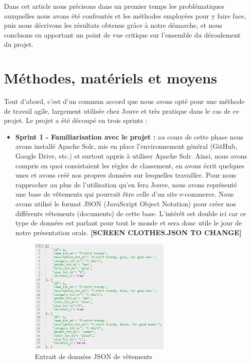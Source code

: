 \documentclass[twocolumn,a4paper]{IEEEtranfr}
\begin{document}
Dans cet article nous précisons dans un premier temps les problématiques auxquelles nous avons été confrontés et les méthodes employées pour y faire face, puis nous décrivons les résultats obtenus grâce à notre démarche, et nous concluons en apportant un point de vue critique sur l'ensemble du déroulement du projet.

\section{Méthodes, matériels et moyens}
Tout d'abord, c'est d'un commun accord que nous avons opté pour une méthode de travail agile, largement utilisée chez Jouve et très pratique dans le cas de ce projet. Le projet a été découpé en trois sprints :
\begin{itemize}
  \item \textbf{Sprint 1 - Familiarisation avec le projet :} au cours de cette phase nous avons installé Apache Solr, mis en place l'environnement général (GitHub, Google Drive, etc.) et surtout appris à utiliser Apache Solr. Ainsi, nous avons compris en quoi consistaient les règles de classement, en avons écrit quelques unes et avons créé nos propres données sur lesquelles travailler. Pour nous rapprocher au plus de l'utilisation qu'en fera Jouve, nous avons représenté une base de vêtements qui pourrait être celle d'un site e-commerce. Nous avons utilisé le format JSON (JavaScript Object Notation) pour créer nos différents vêtements (documents) de cette base. L'intérêt est double ici car ce type de données est parlant pour tout le monde et sera donc utile le jour de notre présentation orale. \textbf{[SCREEN CLOTHES.JSON TO CHANGE]}
  \begin{figure}[htpb]
    \begin{center}
        \includegraphics[width=7cm]{clothes.png}
    \end{center}
    \caption{Extrait de données JSON de vêtements}
    \label{clothes}
  \end{figure}
  

\end{itemize}
\end{document}
